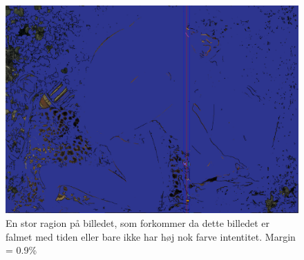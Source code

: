 \begin{figure}[h!!]
	\begin{center}
		\includegraphics[scale=0.20,angle=0]{afsnit/afprovning/billeder/nicofloodfillbilledet.png}
	\end{center}
	\caption[]{En stor ragion på billedet, som forkommer da dette
	billedet er falmet med tiden eller bare ikke har høj nok farve
	intentitet. Margin = 0.9\%}
	\label{nicofill}
\end{figure}


